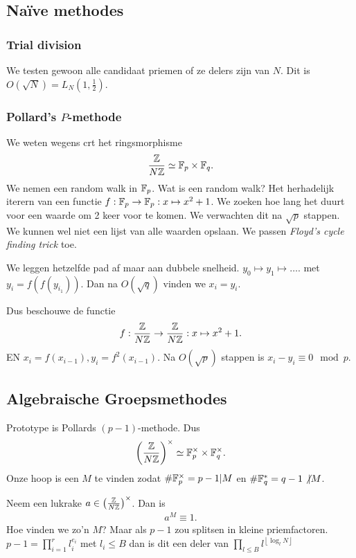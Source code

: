 \subsection{Na\"ive methodes} \label{sec:na\"ive_methodes}
\subsubsection{Trial division} \label{sec:trial_division}
We testen gewoon alle candidaat priemen of ze delers zijn van $N$. Dit is $O(\sqrt{N}) = L_N(1, \frac{1}{2})$.

\subsubsection{Pollard's $P$-methode} \label{sec:pollard's_$p$-methode}
We weten wegens crt het ringsmorphisme \[
\frac{\mathbb{Z}}{N\mathbb{Z}} \simeq \mathbb{F}_p \times \mathbb{F}_q
.\] 
We nemen een random walk in $\mathbb{F}_p$. Wat is een random walk? Het herhadelijk iterern van een functie $f: \mathbb{F}_p \to \mathbb{F}_p: x \mapsto x^2+1$. 
We zoeken hoe lang het duurt voor een waarde om 2 keer voor te komen. 
We verwachten dit na $\sqrt{p} $ stappen. 
We kunnen wel niet een lijst van alle waarden opslaan. 
We passen \emph{Floyd's cycle finding trick} toe. 

We leggen hetzelfde pad af maar aan dubbele snelheid. $y_0 \mapsto y_1 \mapsto \ldots.$ met $y_{i} = f(f(y_{i_1}))$. 
Dan na $O(\sqrt{q} )$ vinden we $x_i = y_i$. 


Dus beschouwe de functie \[
f: \frac{\mathbb{Z}}{N\mathbb{Z}} \to \frac{\mathbb{Z}}{N\mathbb{Z}}: x \mapsto x^2 + 1
.\]
EN $x_i = f(x_{i-1}), y_i = f^2(x_{i-1})$. 
Na $O(\sqrt{p} ) $ stappen is $x_i - y_i \equiv 0 \mod p$.

\subsection{Algebraische Groepsmethodes} \label{sec:algebraische_groepsmethodes}

Prototype is Pollards  $(p-1)$-methode.
Dus 
 \begin{align*}
	 \left( \frac{\mathbb{Z}}{N\mathbb{Z}} \right) ^{\times } \simeq \mathbb{F}_p^{\times } \times \mathbb{F}^{\times }_q
.\end{align*}
Onze hoop is een $M$ te vinden zodat $\#\mathbb{F}_p^{\times  } = p-1 | M$ en $\# \mathbb{F}_q^* = q-1 \not | M$.

Neem een lukrake $a \in \left( \frac{\mathbb{Z}}{N\mathbb{Z}} \right) ^{\times }$. Dan is 
\begin{align*}
	a^{M} \equiv 1
.\end{align*}
Hoe vinden we zo'n $ M$?
Maar als $p-1$ zou splitsen in kleine priemfactoren. $p-1 = \prod_{i = 1}^{r}l_i^{e_i}$ met $l_i \le B$ dan is dit een deler van $\prod_{l \le B}l ^{\left\lfloor \log_l N \right\rfloor}$ 

